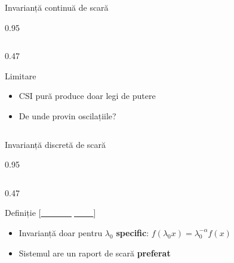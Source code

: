 \documentclass[9pt, aspectratio=169, t]{beamer}
\begin{document}
\begin{frame}{Invarianță continuă de scară}
\begin{cminipage}{0.95\textwidth}
{\begin{columns}[T]
\begin{column}{0.47\textwidth}
            \begin{block}{Limitare}
                \begin{itemize}\setlength{\itemsep}{0pt}
                    \item CSI pură produce doar legi de putere
                    \item De unde provin oscilațiile?
                \end{itemize}
            \end{block}
        \end{column}
    \end{columns}
    }
    \end{cminipage}
\end{frame}

\begin{frame}{Invarianță discretă de scară}
    \begin{cminipage}{0.95\textwidth}
    {\footnotesize
    \begin{columns}[T]
        \begin{column}{0.47\textwidth}
            \begin{block}{Definiție {\scriptsize[\href{https://doi.org/10.1016/S0370-1573(97)00076-8}{\textcolor{white}{Sornette, 1998}}]}}
                \begin{itemize}\setlength{\itemsep}{0pt}
                    \item Invarianță doar pentru $\lambda_0$ \textbf{specific}: $f(\lambda_0 x) = \lambda_0^{-\alpha} f(x)$
                    \item Sistemul are un raport de scară \textbf{preferat}
                \end{itemize}
            \end{block}


\end{column}
\end{columns}}
\end{cminipage}
\end{frame}
\end{document}
